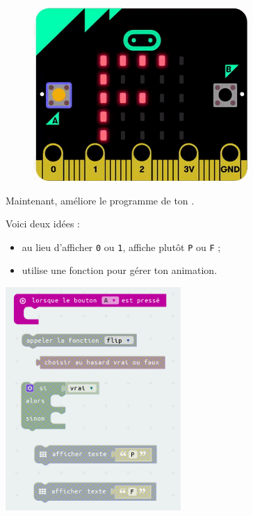 \begin{figure}
    \includegraphics[width=\linewidth]{res/mbPileFaceN2.png}
\end{figure}
\begin{eleve}
Maintenant, {\Large{améliore}} le programme de ton \mb.

Voici deux idées :
\begin{itemize}
    \item au lieu d'afficher \texttt{0} ou \texttt{1}, affiche plutôt \texttt{P} ou \texttt{F} ;
    \item utilise une fonction pour gérer ton animation.
\end{itemize}
\includegraphics[width=0.5\textwidth]{res/mbPilefaceN2blocs.png}
\end{eleve}


